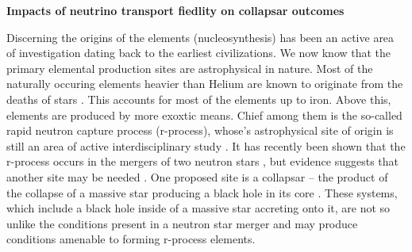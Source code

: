 \documentclass[12pt]{article}
\begin{document}
\setcounter{page}{1}  \renewcommand{\thepage}
           {\arabic{page} }%

\begin{center}
{\bf Impacts of neutrino transport fiedlity on collapsar outcomes} \vspace{-0.15in}
\end{center}




Discerning the origins of the elements (nucleosynthesis) has been an active area of investigation dating back to the earliest civilizations.
We now know that the primary elemental production sites are astrophysical in nature.
Most of the naturally occuring elements heavier than Helium are known to originate from the deaths of stars \citep{burbidge:1957}.
This accounts for most of the elements up to iron.
Above this, elements are produced by more exoxtic means.
Chief among them is the so-called rapid neutron capture process (r-process), whose's astrophysical site of origin is still an area of active interdisciplinary study \citep{horowitz:2019}.
It has recently been shown that the r-process occurs in the mergers of two neutron stars \citep{abbott:2017a}, but evidence suggests that another site may be needed \citep{martinez-pinedo:2014}.
One proposed site is a collapsar \citep{siegel:2019}-- the product of the collapse of a massive star producing a black hole in its core \citep{Woosley1993, MacFadyen_1999}.
These systems, which include a black hole inside of a massive star accreting onto it, are not so unlike the conditions present in a neutron star merger and may produce conditions amenable to forming r-process elements.
\end{document}
